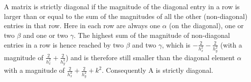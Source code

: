 \hfill \\
\hfill \\
A matrix is strictly diagonal if the magnitude of the diagonal entry in a row is larger than or equal to the sum of the magnitudes of all the other (non-diagonal) entries in that row. Here in each row are always one $\alpha$ (on the diagonal), one or two $\beta$ and one or two $\gamma$. The highest sum of the magnitude of non-diagonal entries in a row is hence reached by two $\beta$ and two $\gamma$, which is $-\frac{2}{h_{x}^{2}} -\frac{2}{h_{y}^{2}}$ (with a magnitude of $\frac{2}{h_{x}^{2}} + \frac{2}{h_{y}^{2}}$)  and is therefore still smaller than the diagonal element $\alpha$ with a magnitude of $\frac{2}{h_{x}^{2}} + \frac{2}{h_{y}^{2}} + k^{2}$. Consequently A is strictly diagonal.
